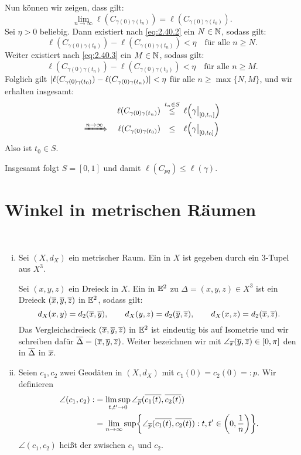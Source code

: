 \begin{beweis}
\begin{itemize}
		Nun können wir zeigen, dass gilt:
		\[
			\lim\limits_{n \rightarrow \infty} \ell(C_{\gamma(0)\gamma(t_n)}) = \ell(C_{\gamma(0)\gamma(t_0)}).
		\]
		Sei $\eta > 0$ beliebig.
		Dann existiert nach \eqref{eq:2.40.2} ein $N \in \mathbb{N}$, sodass gilt:
		\[
			\ell(C_{\gamma(0)\gamma(t_0)}) - \ell(C_{\gamma(0)\gamma(t_n)}) < \eta \quad \text{für alle } n \geq N.
		\]
		Weiter existiert nach \eqref{eq:2.40.3} ein $M \in \mathbb{N}$, sodass gilt:
		\[
			\ell(C_{\gamma(0)\gamma(t_n)}) - \ell(C_{\gamma(0)\gamma(t_0)}) < \eta \quad \text{für alle } n \geq M.
		\]		
		Folglich gilt $\lvert\ell(C_{\gamma(0)\gamma(t_0)}) - \ell(C_{\gamma(0)\gamma(t_n)})\rvert < \eta$ für alle $n \geq \max\{N,M\}$, und wir erhalten insgesamt:
		\begin{align*}
			\ell(C_{\gamma(0)\gamma(t_n)}) &\stack{t_n \in S}{\leq} \ell\enbrace*{\gamma \big|_{[0,t_n]}} \\
			\xRightarrow{n \rightarrow \infty} \quad \ell(C_{\gamma(0)\gamma(t_0)}) &\stack{}{\leq} \ell\enbrace*{\gamma \big|_{[0,t_0]}}
		\end{align*}
		Also ist $t_0 \in S$.
	\end{itemize}
	Insgesamt folgt $S = [0,1]$ und damit $\ell(C_{pq}) \leq \ell(\gamma)$. \qedhere
\end{beweis}

\section{Winkel in metrischen Räumen}
\label{sec:2.4}

\begin{definition}
\label{def:2.41}
	\mbox{} \\[-1.35cm]
	\begin{enumerate}[(i)]
		\item Sei $(X,d_X)$ ein metrischer Raum. 
		Ein  in $X$ ist gegeben durch ein $3$-Tupel aus $X^3$.
		
		Sei $(x,y,z)$ ein Dreieck in $X$.
		Ein  in $\mathbb{E}^2$ zu $\Delta = (x,y,z) \in X^3$ ist ein Dreieck $(\overline{x},\overline{y},\overline{z})$ in $\mathbb{E}^2$, sodass gilt:
		\[
			d_X(x,y) = d_2(\overline{x},\overline{y}), \qquad d_X(y,z) = d_2(\overline{y},\overline{z}), \qquad d_X(x,z) = d_2(\overline{x},\overline{z}).
		\]
		Das Vergleichsdreieck $(\overline{x},\overline{y},\overline{z})$ in $\mathbb{E}^2$ ist eindeutig bis auf Isometrie und wir schreiben dafür $\overline{\Delta} = (\overline{x},\overline{y},\overline{z})$.
		Weiter bezeichnen wir mit $\angle_{\overline{x}}(\overline{y},\overline{z}) \in [0,\pi]$ den  in $\overline{\Delta}$ in $\overline{x}$.
		\item Seien $c_1,c_2$ zwei Geodäten in $(X,d_X)$ mit $c_1(0) = c_2(0) =:p$.
		Wir definieren
		\begin{align*}
			\angle(c_1,c_2) :&= \limsup_{t,t' \rightarrow 0} \angle_{\ol{p}} (\ol{c_1(t)},\ol{c_2(t)}) \\
			&= \lim\limits_{n \rightarrow \infty} \sup \penbrace*{ \angle_{\ol{p}}(\ol{c_1(t)},\ol{c_2(t)}) : t,t' \in \enbrace*{0,\frac{1}{n}}}.
		\end{align*}
		$\angle(c_1,c_2)$ heißt der  zwischen $c_1$ und $c_2$.
	\end{enumerate}
\end{definition}

